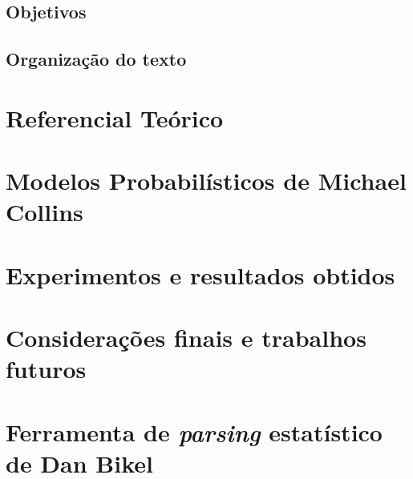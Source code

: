 \documentclass[a4paper]{abnt}
\begin{document}
\section{Objetivos}
\label{sec:objetivos}
	

\newpage

\section{Organização do texto}
\label{sec:organizacao}
	

\chapter{Referencial Teórico}
\label{cha:referencial_teorico}
	

\chapter{Modelos Probabilísticos de Michael Collins}
\label{cha:michael_collins}
	

\chapter{Experimentos e resultados obtidos}
\label{cha:resultados_obtidos}
	

\chapter{Considerações finais e trabalhos futuros}
\label{cha:consideracoes_finais}
	

%	

%
%

\renewcommand{\bibname}{Referência Bibliográfica}


%


\appendix

\chapter{Ferramenta de \emph{parsing} estatístico de Dan Bikel}
\label{cha:dan_bikel1}
	
\end{document}
